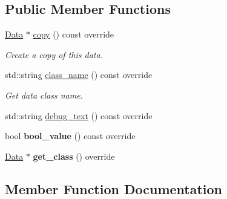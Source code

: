 \subsection*{Public Member Functions}
\begin{DoxyCompactItemize}
\item 
\hyperlink{classcreek_1_1_data}{Data} $\ast$ \hyperlink{classcreek_1_1_void_a300fcf4986fb668caf5a9d81b571b6d6}{copy} () const  override\hypertarget{classcreek_1_1_void_a300fcf4986fb668caf5a9d81b571b6d6}{}\label{classcreek_1_1_void_a300fcf4986fb668caf5a9d81b571b6d6}

\begin{DoxyCompactList}\small\item\em Create a copy of this data. \end{DoxyCompactList}\item 
std\+::string \hyperlink{classcreek_1_1_void_a37175908898e47d6dc39d4df15217e5b}{class\+\_\+name} () const  override\hypertarget{classcreek_1_1_void_a37175908898e47d6dc39d4df15217e5b}{}\label{classcreek_1_1_void_a37175908898e47d6dc39d4df15217e5b}

\begin{DoxyCompactList}\small\item\em Get data class name. \end{DoxyCompactList}\item 
std\+::string \hyperlink{classcreek_1_1_void_addfb8b716d2f9cdd92de009460aa2f7b}{debug\+\_\+text} () const  override
\item 
bool {\bfseries bool\+\_\+value} () const  override\hypertarget{classcreek_1_1_void_a1945ab98bce95a253addf50d86c03bd9}{}\label{classcreek_1_1_void_a1945ab98bce95a253addf50d86c03bd9}

\item 
\hyperlink{classcreek_1_1_data}{Data} $\ast$ {\bfseries get\+\_\+class} () override\hypertarget{classcreek_1_1_void_a80e43ad8b7576f92d3332ab80aaaa5d5}{}\label{classcreek_1_1_void_a80e43ad8b7576f92d3332ab80aaaa5d5}

\end{DoxyCompactItemize}


\subsection{Member Function Documentation}
